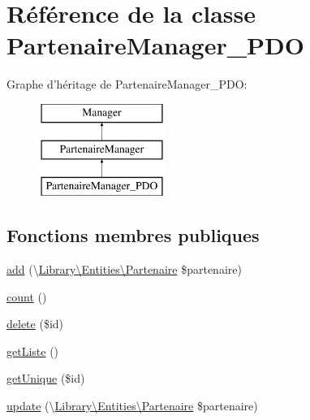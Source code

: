 \hypertarget{class_library_1_1_models_1_1_partenaire_manager___p_d_o}{\section{Référence de la classe Partenaire\+Manager\+\_\+\+P\+D\+O}
\label{class_library_1_1_models_1_1_partenaire_manager___p_d_o}
}
Graphe d'héritage de Partenaire\+Manager\+\_\+\+P\+D\+O\+:\begin{figure}[H]
\begin{center}
\leavevmode
\includegraphics[height=3.000000cm]{class_library_1_1_models_1_1_partenaire_manager___p_d_o}
\end{center}
\end{figure}
\subsection*{Fonctions membres publiques}
\begin{DoxyCompactItemize}
\item 
\hyperlink{class_library_1_1_models_1_1_partenaire_manager___p_d_o_a18c85c0998e15675f78832d5679b41b5}{add} (\textbackslash{}\hyperlink{class_library_1_1_entities_1_1_partenaire}{Library\textbackslash{}\+Entities\textbackslash{}\+Partenaire} \$partenaire)
\item 
\hyperlink{class_library_1_1_models_1_1_partenaire_manager___p_d_o_ac751e87b3d4c4bf2feb03bee8b092755}{count} ()
\item 
\hyperlink{class_library_1_1_models_1_1_partenaire_manager___p_d_o_a2f8258add505482d7f00ea26493a5723}{delete} (\$id)
\item 
\hyperlink{class_library_1_1_models_1_1_partenaire_manager___p_d_o_a20b3a2f576f3ea746f769779a329491e}{get\+Liste} ()
\item 
\hyperlink{class_library_1_1_models_1_1_partenaire_manager___p_d_o_ab94c8b937a2aa55fce0bb7f77f68c00e}{get\+Unique} (\$id)
\item 
\hyperlink{class_library_1_1_models_1_1_partenaire_manager___p_d_o_a1cb71d926c932683003f9b931c294845}{update} (\textbackslash{}\hyperlink{class_library_1_1_entities_1_1_partenaire}{Library\textbackslash{}\+Entities\textbackslash{}\+Partenaire} \$partenaire)
\end{DoxyCompactItemize}
